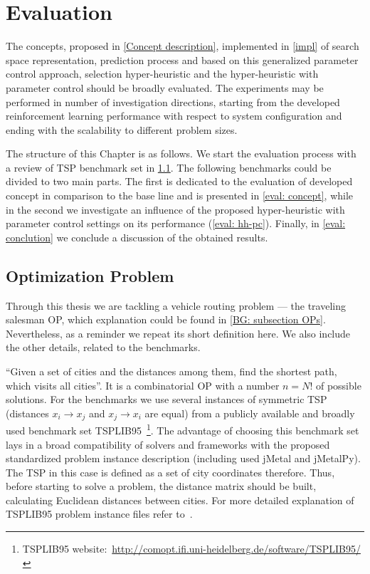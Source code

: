 \chapter{Evaluation}\label{eval}
The concepts, proposed in \cref{Concept description}, implemented in \cref{impl} of search space representation, prediction process and based on this generalized parameter control approach, selection hyper-heuristic and the hyper-heuristic with parameter control should be broadly evaluated. The experiments may be performed in number of investigation directions, starting from the developed reinforcement learning performance with respect to system configuration and ending with the scalability to different problem sizes.

The structure of this Chapter is as follows. We start the evaluation process with a review of TSP benchmark set in \cref{eval: op}. The following benchmarks could be divided to two main parts. The first is dedicated to the evaluation of developed concept in comparison to the base line and is presented in \cref{eval: concept}, while in the second we investigate an influence of the proposed hyper-heuristic with parameter control settings on its performance (\cref{eval: hh-pc}). Finally, in \cref{eval: conclution} we conclude a discussion of the obtained results.


\section{Optimization Problem}\label{eval: op}
Through this thesis we are tackling a vehicle routing problem — the traveling salesman OP, which explanation could be found in \cref{BG: subsection OPs}. Nevertheless, as a reminder we repeat its short definition here. We also include the other details, related to the benchmarks.

``Given a set of cities and the distances among them, find the shortest path, which visits all cities''. It is a combinatorial OP with a number $n = N!$ of possible solutions. For the benchmarks we use several instances of symmetric TSP (distances $x_i \rightarrow x_j$ and $x_j \rightarrow x_i$ are equal) from a publicly available and broadly used benchmark set TSPLIB95~\footnote{TSPLIB95 website:~\url{http://comopt.ifi.uni-heidelberg.de/software/TSPLIB95/}}. The advantage of choosing this benchmark set lays in a broad compatibility of solvers and frameworks with the proposed standardized problem instance description (including used jMetal and jMetalPy). The TSP in this case is defined as a set of city coordinates therefore. Thus, before starting to solve a problem, the distance matrix should be built, calculating Euclidean distances between cities. For more detailed explanation of TSPLIB95 problem instance files refer to~\cite{reinelt1995tsplib95}.

